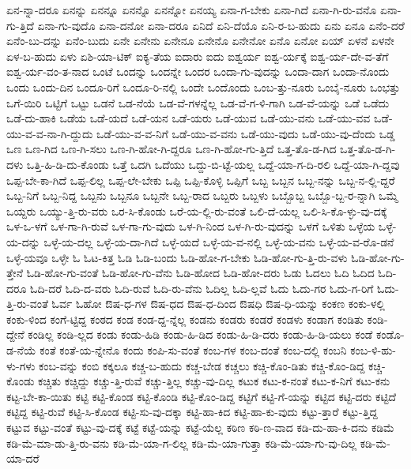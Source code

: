 {ಏನ-ನ್ನಾ-ದರೂ
ಏನನ್ನು
ಏನನ್ನೂ
ಏನನ್ನೊ
ಏನನ್ನೋ
ಏನಯ್ಯ
ಏನಾ-ಗ-ಬೇಕು
ಏನಾ-ಗಿದೆ
ಏನಾ-ಗಿ-ರು-ವನೊ
ಏನಾ-ಗು-ತ್ತಿದೆ
ಏನಾ-ಗು-ವುದೊ
ಏನಾ-ದನೋ
ಏನಾ-ದರೂ
ಏನಿದೆ
ಏನಿ-ದೆಯೊ
ಏನಿ-ರ-ಬ-ಹುದು
ಏನು
ಏನೂ
ಏನೆಂ-ದರೆ
ಏನೆಂ-ಬು-ದನ್ನು
ಏನೆಂ-ಬುದು
ಏನೇ
ಏನೇನು
ಏನೇನೂ
ಏನೇನೊ
ಏನೇನೋ
ಏನೊ
ಏನೋ
ಏಯ್
ಏಳನೆ
ಏಳನೇ
ಏಳ-ಬ-ಹುದು
ಏಳು
ಏಶಿ-ಯಾ-ಟಿಕ್
ಐಕ್ಯ-ತೆಯ
ಐದಾರು
ಐದು
ಐಶ್ವರ್ಯ
ಐಶ್ವ-ರ್ಯಕ್ಕೆ
ಐಶ್ವ-ರ್ಯ-ದೇ-ವ-ತೆಗೆ
ಐಶ್ವ-ರ್ಯ-ವಂ-ತ-ನಾದ
ಒಂಟೆ
ಒಂದನ್ನು
ಒಂದನ್ನೇ
ಒಂದರ
ಒಂದಾ-ಗು-ವುದನ್ನು
ಒಂದಾ-ದಾಗ
ಒಂದಾ-ನೊಂದು
ಒಂದು
ಒಂದು-ದಿನ
ಒಂದೂ-ರಿಗೆ
ಒಂದೂ-ರಿ-ನಲ್ಲಿ
ಒಂದೇ
ಒಂದೊಂದು
ಒಂಬ-ತ್ತು-ನೂರು
ಒಂಬೈ-ನೂರು
ಒಂಭತ್ತು
ಒಗೆ-ಯಿರಿ
ಒಟ್ಟಿಗೆ
ಒಟ್ಟು
ಒಡನೆ
ಒಡ-ನೆಯೆ
ಒಡ-ವೆ-ಗಳನ್ನೆಲ್ಲ
ಒಡ-ವೆ-ಗ-ಳಿ-ಗಾಗಿ
ಒಡ-ವೆ-ಯನ್ನು
ಒಡೆ
ಒಡೆದು
ಒಡೆ-ದು-ಹಾಕಿ
ಒಡೆಯ
ಒಡೆ-ಯದೆ
ಒಡೆ-ಯನ
ಒಡೆ-ಯರು
ಒಡೆ-ಯುವ
ಒಡೆ-ಯು-ವನು
ಒಡೆ-ಯು-ವವ
ಒಡೆ-ಯು-ವ-ವ-ನಾ-ಗಿ-ದ್ದುದು
ಒಡೆ-ಯು-ವ-ವ-ನಿಗೆ
ಒಡೆ-ಯು-ವ-ವನು
ಒಡೆ-ಯು-ವುದು
ಒಡೆ-ಯು-ವು-ದೆಂದು
ಒಡ್ಡ
ಒಣ
ಒಣ-ಗಿದ
ಒಣ-ಗಿ-ಸಲು
ಒಣ-ಗಿ-ಹೋ-ಗಿ-ದ್ದರೂ
ಒಣ-ಗಿ-ಹೋ-ಗು-ತ್ತಿದೆ
ಒತ್ತ-ತೊ-ಡ-ಗಿದ
ಒತ್ತ-ತೊ-ಡ-ಗಿ-ದಳು
ಒತ್ತಿ-ಹಿ-ಡಿ-ದು-ಕೊಂಡು
ಒತ್ತೆ
ಒದಗಿ
ಒದೆಯು
ಒದ್ದು-ಬಿ-ಟ್ಟೆ-ಯಲ್ಲ
ಒದ್ದೆ-ಯಾ-ಗ-ದಿ-ರಲಿ
ಒದ್ದೆ-ಯಾ-ಗಿ-ದ್ದವು
ಒಪ್ಪ-ಬೇ-ಕಾ-ಗಿದೆ
ಒಪ್ಪ-ಲಿಲ್ಲ
ಒಪ್ಪ-ಲೇ-ಬೇಕು
ಒಪ್ಪಿ
ಒಪ್ಪಿ-ಕೊಳ್ಳಿ
ಒಪ್ಪಿಗೆ
ಒಬ್ಬ
ಒಬ್ಬನ
ಒಬ್ಬ-ನನ್ನು
ಒಬ್ಬ-ನ-ಲ್ಲಿ-ದ್ದರೆ
ಒಬ್ಬ-ನಿಗೆ
ಒಬ್ಬ-ನಿದ್ದ
ಒಬ್ಬನು
ಒಬ್ಬನೂ
ಒಬ್ಬನೇ
ಒಬ್ಬ-ರಾದ
ಒಬ್ಬರು
ಒಬ್ಬಳು
ಒಬ್ಬೊಬ್ಬ
ಒಬ್ಬೊ-ಬ್ಬ-ರ-ನ್ನಾಗಿ
ಒಮ್ಮೆ
ಒಯ್ದರು
ಒಯ್ಯು-ತ್ತಿ-ರು-ವರು
ಒರ-ಸಿ-ಕೊಂಡು
ಒರೆ-ಯ-ಲ್ಲಿ-ರು-ವಂತೆ
ಒಲಿ-ದೆ-ಯಲ್ಲ
ಒಲಿ-ಸಿ-ಕೊ-ಳ್ಳು-ವು-ದಕ್ಕೆ
ಒಳ-ಒ-ಳಗೆ
ಒಳ-ಗಾ-ಗಿ-ರುವೆ
ಒಳ-ಗಾ-ಗು-ವುದು
ಒಳ-ಗಿ-ನಿಂದ
ಒಳ-ಗಿ-ರು-ವುದನ್ನು
ಒಳಗೆ
ಒಳಿತು
ಒಳ್ಳೆಯ
ಒಳ್ಳೆ-ಯ-ದನ್ನು
ಒಳ್ಳೆ-ಯ-ದಲ್ಲ
ಒಳ್ಳೆ-ಯ-ದಾ-ಗಿದೆ
ಒಳ್ಳೆ-ಯದೆ
ಒಳ್ಳೆ-ಯ-ವ-ನಲ್ಲಿ
ಒಳ್ಳೆ-ಯ-ವನು
ಒಳ್ಳೆ-ಯ-ವ-ರೊ-ಡನೆ
ಒಳ್ಳೆ-ಯವೂ
ಒಳ್ಳೇ
ಓ
ಓಟ-ಕಿತ್ತ
ಓಡಿ
ಓಡಿ-ಬಂದು
ಓಡಿ-ಹೋ-ಗ-ಬೇಕು
ಓಡಿ-ಹೋ-ಗು-ತ್ತಿ-ರು-ವಳು
ಓಡಿ-ಹೋ-ಗು-ತ್ತೇನೆ
ಓಡಿ-ಹೋ-ಗು-ವಂತೆ
ಓಡಿ-ಹೋ-ಗು-ವೆನು
ಓಡಿ-ಹೋದ
ಓಡಿ-ಹೋ-ದರು
ಓಡು
ಓದಲು
ಓದಿ
ಓದಿದ
ಓದಿ-ದರೂ
ಓದಿ-ದರೆ
ಓದಿ-ದ-ವರು
ಓದಿ-ರುವೆ
ಓದಿ-ರು-ವೆನು
ಓದಿಲ್ಲ
ಓದಿ-ಲ್ಲವೆ
ಓದು
ಓದು-ಗರ
ಓದು-ಗ-ರಿಗೆ
ಓದು-ತ್ತಿ-ರು-ವಂತೆ
ಓರ್ವ
ಓಹೋ
ಔಷ-ಧ-ಗಳ
ಔಷ-ಧದ
ಔಷ-ಧ-ದಿಂದ
ಔಷಧಿ
ಔಷ-ಧಿ-ಯನ್ನು
ಕಂಕಣ
ಕಂಕು-ಳಲ್ಲಿ
ಕಂಕು-ಳಿಂದ
ಕಂಗೆ-ಟ್ಟಿದ್ದ
ಕಂಠದ
ಕಂಡ
ಕಂಡ-ದ್ದ-ನ್ನೆಲ್ಲ
ಕಂಡನು
ಕಂಡರು
ಕಂಡರೆ
ಕಂಡಳು
ಕಂಡಾಗ
ಕಂಡಿತು
ಕಂಡಿ-ದ್ದೇನೆ
ಕಂಡಿಲ್ಲ
ಕಂಡಿ-ಲ್ಲದ
ಕಂಡು
ಕಂಡು-ಹಿಡಿ
ಕಂಡು-ಹಿ-ಡಿದ
ಕಂಡು-ಹಿ-ಡಿ-ದರು
ಕಂಡು-ಹಿ-ಡಿ-ಯಲು
ಕಂಡೆ
ಕಂಡೊ-ಡ-ನೆಯೆ
ಕಂತೆ
ಕಂತೆ-ಯ-ನ್ನೇನೊ
ಕಂದು
ಕಂಪಿ-ಸು-ವಂತೆ
ಕಂಬ-ಗಳ
ಕಂಬ-ದಂತೆ
ಕಂಬ-ದಲ್ಲಿ
ಕಂಬನಿ
ಕಂಬ-ಳಿ-ಹು-ಳು-ಗಳು
ಕಂಬ-ವನ್ನು
ಕಂಬಿ
ಕಕ್ಕಲೂ
ಕಚ್ಚ-ಬ-ಹುದು
ಕಚ್ಚ-ಬೇಡ
ಕಚ್ಚಲು
ಕಚ್ಚಿ-ಕೊಂ-ಡಿತು
ಕಚ್ಚಿ-ಕೊಂ-ಡಿದ್ದ
ಕಚ್ಚಿ-ಕೊಂಡು
ಕಚ್ಚಿತು
ಕಚ್ಚಿದ್ದು
ಕಚ್ಚು-ತ್ತಿ-ರುವೆ
ಕಚ್ಚು-ತ್ತಿಲ್ಲ
ಕಚ್ಚು-ವು-ದಿಲ್ಲ
ಕಟುಕ
ಕಟು-ಕ-ನಂತೆ
ಕಟು-ಕ-ನಿಗೆ
ಕಟು-ಕನು
ಕಟ್ಟ-ಬೇ-ಕಾ-ಯಿತು
ಕಟ್ಟಿ
ಕಟ್ಟಿ-ಕೊಂಡ
ಕಟ್ಟಿ-ಕೊಂಡಿ
ಕಟ್ಟಿ-ಕೊಂ-ಡಿದ್ದ
ಕಟ್ಟಿಗೆ
ಕಟ್ಟಿ-ಗೆ-ಯನ್ನು
ಕಟ್ಟಿದ
ಕಟ್ಟಿ-ದರು
ಕಟ್ಟಿದೆ
ಕಟ್ಟಿದ್ದ
ಕಟ್ಟಿ-ರುವೆ
ಕಟ್ಟಿ-ಸಿ-ಕೊಂಡ
ಕಟ್ಟಿ-ಸು-ವು-ದಕ್ಕಾ
ಕಟ್ಟಿ-ಹಾ-ಕಿದ
ಕಟ್ಟಿ-ಹಾ-ಕು-ವುದು
ಕಟ್ಟು-ತ್ತಾರೆ
ಕಟ್ಟು-ತ್ತಿದ್ದ
ಕಟ್ಟುವ
ಕಟ್ಟು-ವಂತೆ
ಕಟ್ಟು-ವು-ದಕ್ಕೆ
ಕಟ್ಟೆ
ಕಟ್ಟೆ-ಯನ್ನು
ಕಟ್ಟೆ-ಯೆಲ್ಲ
ಕಠಿಣ
ಕಠಿ-ಣ-ವಾದ
ಕಡಿ-ದು-ಹಾ-ಕಿ-ದನು
ಕಡಿಮೆ
ಕಡಿ-ಮೆ-ಮಾ-ಡು-ತ್ತಿ-ರು-ವನು
ಕಡಿ-ಮೆ-ಯಾ-ಗ-ಲಿಲ್ಲ
ಕಡಿ-ಮೆ-ಯಾ-ಗುತ್ತಾ
ಕಡಿ-ಮೆ-ಯಾ-ಗು-ವು-ದಿಲ್ಲ
ಕಡಿ-ಮೆ-ಯಾ-ದರೆ
}

